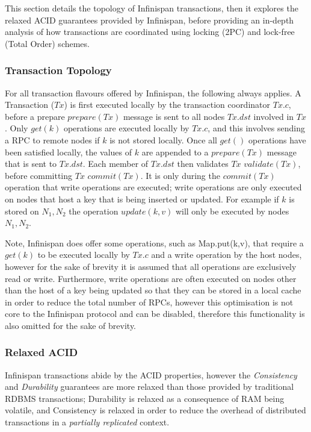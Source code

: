     This section details the topology of Infinispan transactions, then it explores the relaxed ACID guarantees provided by Infinispan, before providing an in-depth analysis of how transactions are coordinated using locking (2PC) and lock-free (Total Order) schemes. 
    
		\subsubsection{Transaction Topology}
		For all transaction flavours offered by Infinispan, the following always applies.  A Transaction ($Tx$) is first executed locally by the transaction coordinator $Tx.c$, before a prepare $prepare(Tx)$ message is sent to all nodes $Tx.dst$ involved in $Tx$.  Only $get(k)$ operations are executed locally by $Tx.c$, and this involves sending a RPC to remote nodes if $k$ is not stored locally.  Once all $get()$ operations have been satisfied locally, the values of $k$ are appended to a $prepare(Tx)$ message that is sent to $Tx.dst$.  Each member of $Tx.dst$ then validates $Tx$ $validate(Tx)$, before committing $Tx$ $commit(Tx)$.  It is only during the $commit(Tx)$ operation that write operations are executed; write operations are only executed on nodes that host a key that is being inserted or updated.  For example if $k$ is stored on $N_1, N_2$ the operation $update(k, v)$ will only be executed by nodes $N_1, N_2$.  
		
		Note, Infinispan does offer some operations, such as \textsf{Map.put(k,v)}, that require a $get(k)$ to be executed locally by $Tx.c$ and a write operation by the host nodes, however for the sake of brevity it is assumed that all operations are exclusively read or write.  Furthermore, write operations are often executed on nodes other than the host of a key being updated so that they can be stored in a local cache in order to reduce the total number of RPCs, however this optimisation is not core to the Infinispan protocol and can be disabled, therefore this functionality is also omitted for the sake of brevity.  
    
	    \subsubsection{Relaxed ACID}
	    Infinispan transactions abide by the ACID\citep{Haerder:1983:PTD:289.291} properties, however the \emph{Consistency} and \emph{Durability} guarantees are more relaxed than those provided by traditional RDBMS transactions; Durability is relaxed as a consequence of RAM being volatile, and Consistency is relaxed in order to reduce the overhead of distributed transactions in a \emph{partially replicated} context.  
	    
